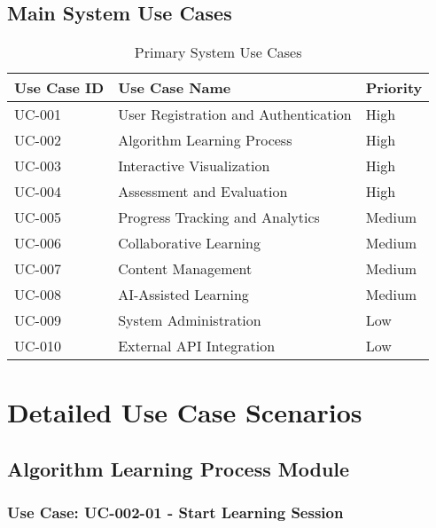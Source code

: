 \documentclass[12pt,a4paper]{article}
\begin{document}
\subsection{Main System Use Cases}
\begin{table}[H]
\centering
\caption{Primary System Use Cases}
\begin{tabularx}{\textwidth}{|l|X|l|}
\hline
\rowcolor{lightblue}
\textbf{Use Case ID} & \textbf{Use Case Name} & \textbf{Priority} \\
\hline
UC-001 & User Registration and Authentication & High \\
\hline
UC-002 & Algorithm Learning Process & High \\
\hline
UC-003 & Interactive Visualization & High \\
\hline
UC-004 & Assessment and Evaluation & High \\
\hline
UC-005 & Progress Tracking and Analytics & Medium \\
\hline
UC-006 & Collaborative Learning & Medium \\
\hline
UC-007 & Content Management & Medium \\
\hline
UC-008 & AI-Assisted Learning & Medium \\
\hline
UC-009 & System Administration & Low \\
\hline
UC-010 & External API Integration & Low \\
\hline
\end{tabularx}
\end{table}

\section{Detailed Use Case Scenarios}

\subsection{Algorithm Learning Process Module}

\subsubsection{Use Case: UC-002-01 - Start Learning Session}
\end{document}
